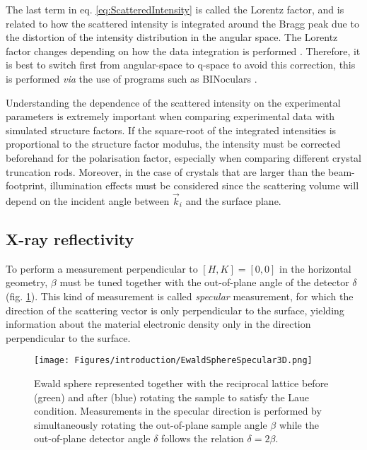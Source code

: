 The last term in eq. \ref{eq:ScatteredIntensity} is called the Lorentz factor, and is related to how the scattered intensity is integrated around the Bragg peak due to the distortion of the intensity distribution in the angular space.
The Lorentz factor changes depending on how the data integration is performed \parencite{Robach2000, Drnec2014}.
Therefore, it is best to switch first from angular-space to q-space to avoid this correction, this is performed \textit{via} the use of programs such as BINoculars \parencite{Roobol2015}.

Understanding the dependence of the scattered intensity on the experimental parameters is extremely important when comparing experimental data with simulated structure factors.
If the square-root of the integrated intensities is proportional to the structure factor modulus, the intensity must be corrected beforehand for the polarisation factor, especially when comparing different crystal truncation rods.
Moreover, in the case of crystals that are larger than the beam-footprint, illumination effects must be considered since the scattering volume will depend on the incident angle between $\vec{k}_i$ and the surface plane.

\subsection{X-ray reflectivity}\label{sec:XRR}

To perform a measurement perpendicular to $[H, K] = [0, 0]$ in the horizontal geometry, $\beta$ must be tuned together with the out-of-plane angle of the detector $\delta$ (fig. \ref{fig:EwaldSphereSpecular}).
This kind of measurement is called \textit{specular} measurement, for which the direction of the scattering vector is only perpendicular to the surface, yielding information about the material electronic density only in the direction perpendicular to the surface.

\begin{figure}[!htb]
    \centering
    \texttt{[image: Figures/introduction/EwaldSphereSpecular3D.png]}
    \caption{
    Ewald sphere represented together with the reciprocal lattice before (green) and after (blue) rotating the sample to satisfy the Laue condition.
    Measurements in the specular direction is performed by simultaneously rotating the out-of-plane sample angle $\beta$ while the out-of-plane detector angle $\delta$ follows the relation $\delta=2\beta$.
    }
    \label{fig:EwaldSphereSpecular}
\end{figure}

